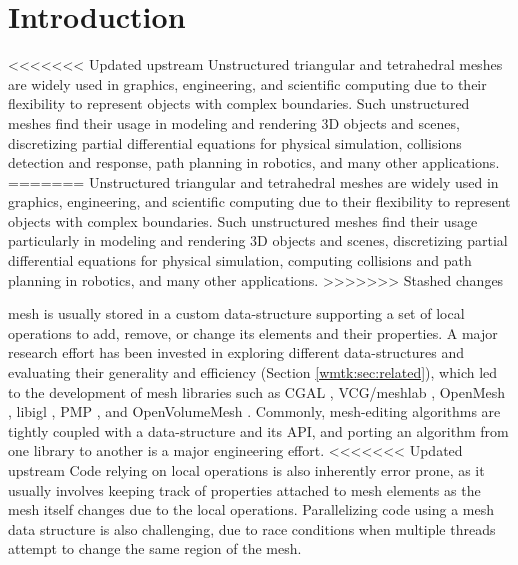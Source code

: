 
\section{Introduction}

<<<<<<< Updated upstream
Unstructured triangular and tetrahedral meshes are widely used in graphics, engineering, and scientific computing due to their flexibility to represent objects with complex boundaries. Such unstructured meshes find their usage in modeling and rendering 3D objects and scenes, discretizing partial differential equations for physical simulation,  collisions detection and response, path planning in robotics, and many other applications.
=======
Unstructured triangular and tetrahedral meshes are widely used in graphics, engineering, and scientific computing due to their flexibility to represent objects with complex boundaries. 
Such unstructured meshes find their usage particularly in modeling and rendering 3D objects and scenes, discretizing partial differential equations for physical simulation, computing collisions and path planning in robotics, and many other applications.
>>>>>>> Stashed changes

 mesh is usually stored in a custom data-structure supporting a set of local operations to add, remove, or change its elements and their properties. A major research effort has been invested in exploring different data-structures and evaluating their generality and efficiency (Section \ref{wmtk:sec:related}), which led to the development of mesh libraries such as CGAL \cite{cgal2008computational}, VCG/meshlab \cite{vcg}, OpenMesh \cite{botsch2002openmesh}, libigl \cite{jacobson2016libigl}, PMP \cite{pmp-library}, and OpenVolumeMesh \cite{kremer2013openvolumemesh}.
Commonly, mesh-editing algorithms are tightly coupled with a data-structure and its API, and porting an algorithm from one library to another is a major engineering effort. 
<<<<<<< Updated upstream
Code relying on local operations is also inherently error prone, as it usually involves keeping track of properties attached to mesh elements as the mesh itself changes due to the local operations. Parallelizing code using a mesh data structure is also challenging, due to race conditions when multiple threads attempt to change the same region of the mesh. 

